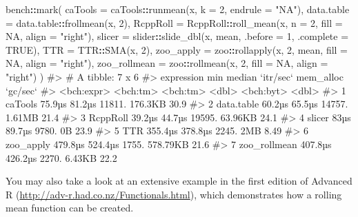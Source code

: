 \documentclass[
]{krantz}
\makeatletter
\newenvironment{Shaded}{\begin{snugshade}}{\end{snugshade}}
\newcommand{\CommentTok}[1]{\textcolor[rgb]{0.56,0.35,0.01}{\textit{#1}}}
\newcommand{\DataTypeTok}[1]{\textcolor[rgb]{0.13,0.29,0.53}{#1}}
\newcommand{\DecValTok}[1]{\textcolor[rgb]{0.00,0.00,0.81}{#1}}
\newcommand{\KeywordTok}[1]{\textcolor[rgb]{0.13,0.29,0.53}{\textbf{#1}}}
\newcommand{\NormalTok}[1]{#1}
\newcommand{\OperatorTok}[1]{\textcolor[rgb]{0.81,0.36,0.00}{\textbf{#1}}}
\newcommand{\OtherTok}[1]{\textcolor[rgb]{0.56,0.35,0.01}{#1}}
\newcommand{\StringTok}[1]{\textcolor[rgb]{0.31,0.60,0.02}{#1}}
\renewcommand{\href}[2]{#2 (\url{#1})}
\newenvironment{kframe}{%
\medskip{}
\setlength{\fboxsep}{.8em}
 \def\at@end@of@kframe{}%
 \ifinner\ifhmode%
  \def\at@end@of@kframe{\end{minipage}}%
  \begin{minipage}{\columnwidth}%
 \fi\fi%
 \def\FrameCommand##1{\hskip\@totalleftmargin \hskip-\fboxsep
 \colorbox{shadecolor}{##1}\hskip-\fboxsep
     \hskip-\linewidth \hskip-\@totalleftmargin \hskip\columnwidth}%
 \MakeFramed {\advance\hsize-\width
   \@totalleftmargin\z@ \linewidth\hsize
   \@setminipage}}%
 {\par\unskip\endMakeFramed%
 \at@end@of@kframe}
\renewenvironment{Shaded}{\begin{kframe}}{\end{kframe}}
\renewcommand{\KeywordTok} [1]{\textcolor[rgb]{0.00,0.44,0.13}{{#1}}}
\renewcommand{\DataTypeTok}[1]{\textcolor[rgb]{0.56,0.13,0.00}{{#1}}}
\renewcommand{\DecValTok}  [1]{\textcolor[rgb]{0.25,0.63,0.44}{{#1}}}
\renewcommand{\StringTok}  [1]{\textcolor[rgb]{0.25,0.44,0.63}{{#1}}}
\renewcommand{\CommentTok} [1]{\textcolor[rgb]{0.38,0.63,0.69}{{#1}}}
\renewcommand{\OtherTok}   [1]{\textcolor[rgb]{0.00,0.44,0.13}{{#1}}}
\renewcommand{\NormalTok}  [1]{{#1}}
\makeatother
\begin{document}
\begin{Shaded}
\begin{Highlighting}[]
\NormalTok{bench}\OperatorTok{::}\KeywordTok{mark}\NormalTok{(}
  \DataTypeTok{caTools =}\NormalTok{ caTools}\OperatorTok{::}\KeywordTok{runmean}\NormalTok{(x, }\DataTypeTok{k =} \DecValTok{2}\NormalTok{, }\DataTypeTok{endrule =} \StringTok{"NA"}\NormalTok{),}
  \DataTypeTok{data.table =}\NormalTok{ data.table}\OperatorTok{::}\KeywordTok{frollmean}\NormalTok{(x, }\DecValTok{2}\NormalTok{),}
  \DataTypeTok{RcppRoll =}\NormalTok{ RcppRoll}\OperatorTok{::}\KeywordTok{roll_mean}\NormalTok{(x, }\DataTypeTok{n =} \DecValTok{2}\NormalTok{, }\DataTypeTok{fill =} \OtherTok{NA}\NormalTok{, }
                                 \DataTypeTok{align =} \StringTok{"right"}\NormalTok{),}
  \DataTypeTok{slicer =}\NormalTok{ slider}\OperatorTok{::}\KeywordTok{slide_dbl}\NormalTok{(x, mean, }\DataTypeTok{.before =} \DecValTok{1}\NormalTok{, }\DataTypeTok{.complete =} \OtherTok{TRUE}\NormalTok{),}
  \DataTypeTok{TTR =}\NormalTok{ TTR}\OperatorTok{::}\KeywordTok{SMA}\NormalTok{(x, }\DecValTok{2}\NormalTok{),}
  \DataTypeTok{zoo_apply =}\NormalTok{ zoo}\OperatorTok{::}\KeywordTok{rollapply}\NormalTok{(x, }\DecValTok{2}\NormalTok{, mean, }\DataTypeTok{fill =} \OtherTok{NA}\NormalTok{, }\DataTypeTok{align =} \StringTok{"right"}\NormalTok{),}
  \DataTypeTok{zoo_rollmean =}\NormalTok{ zoo}\OperatorTok{::}\KeywordTok{rollmean}\NormalTok{(x, }\DecValTok{2}\NormalTok{, }\DataTypeTok{fill =} \OtherTok{NA}\NormalTok{, }\DataTypeTok{align =} \StringTok{"right"}\NormalTok{)}
\NormalTok{)}
\CommentTok{#> # A tibble: 7 x 6}
\CommentTok{#>   expression        min   median `itr/sec` mem_alloc `gc/sec`}
\CommentTok{#>   <bch:expr>   <bch:tm> <bch:tm>     <dbl> <bch:byt>    <dbl>}
\CommentTok{#> 1 caTools        75.9µs   81.2µs    11811.   176.3KB    30.9 }
\CommentTok{#> 2 data.table     60.2µs   65.5µs    14757.    1.61MB    21.4 }
\CommentTok{#> 3 RcppRoll       39.2µs   44.7µs    19595.   63.96KB    24.1 }
\CommentTok{#> 4 slicer           83µs   89.7µs     9780.        0B    23.9 }
\CommentTok{#> 5 TTR           355.4µs  378.8µs     2245.       2MB     8.49}
\CommentTok{#> 6 zoo_apply     479.8µs  524.4µs     1755.  578.79KB    21.6 }
\CommentTok{#> 7 zoo_rollmean  407.8µs  426.2µs     2270.    6.43KB    22.2}
\end{Highlighting}
\end{Shaded}

You may also take a look at an extensive example in the \href{http://adv-r.had.co.nz/Functionals.html}{first edition of Advanced R}, which demonstrates how a rolling mean function can be created.
\end{document}
